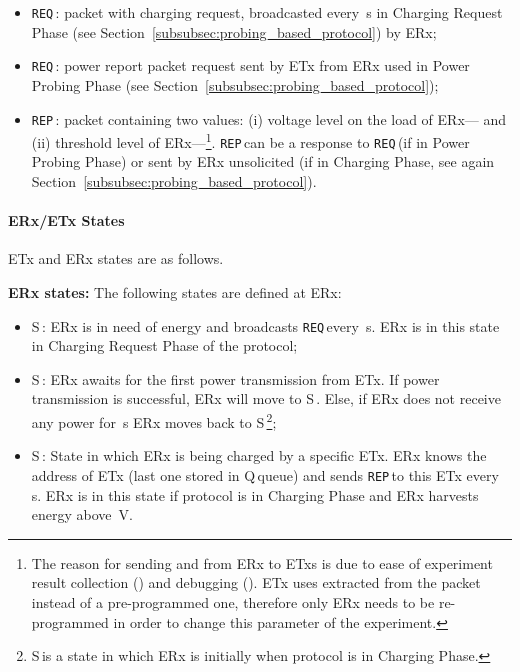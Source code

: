 \documentclass[11pt,draftclsnofoot,journal,onecolumn]{IEEEtran}
\newcommand{\textsubscript}[1]{}
\newcommand{\rxStateIdle}{\textsf{S\textsubscript{IDLE}}\,}
\newcommand{\rxStateWaiting}{\textsf{S\textsubscript{WAIT}}\,}
\newcommand{\rxStateCharged}{\textsf{S\textsubscript{CHARGED}}\,}
\newcommand{\rxDelayPing}{}
\newcommand{\rxDelayWaitingForPower}{}
\newcommand{\rxDelayPowerProbing}{}
\newcommand{\rxVoltageThreshold}{}
\newcommand{\chargingRequest}{\texttt{REQ\textsubscript{CRG}}\,}
\newcommand{\powerProbeReport}{\texttt{REP\textsubscript{PWR}}\,}
\newcommand{\powerProbeRequest}{\texttt{REQ\textsubscript{PWR}}\,}
\newcommand{\txAddressQueue}{Q\textsubscript{TX}\,}
\newcommand{\subparagraph}{}
\begin{document}
\begin{itemize}

\item \chargingRequest: packet with charging request, broadcasted every \rxDelayPing\,s in Charging Request Phase (see Section~\ref{subsubsec:probing_based_protocol}) by ERx;

\item \powerProbeRequest: power report packet request sent by ETx from ERx used in Power Probing Phase (see Section~\ref{subsubsec:probing_based_protocol});

\item \powerProbeReport: packet containing two values: (i) voltage level on the load of ERx--- and (ii) threshold level of ERx---\rxVoltageThreshold\footnote{The reason for sending  and \rxVoltageThreshold from ERx to ETxs is due to ease of experiment result collection () and debugging (\rxVoltageThreshold). ETx uses \rxVoltageThreshold extracted from the packet instead of a pre-programmed one, therefore only ERx needs to be re-programmed in order to change this parameter of the experiment.}. \powerProbeReport can be a response to \powerProbeRequest (if in Power Probing Phase) or sent by ERx unsolicited (if in Charging Phase, see again Section~\ref{subsubsec:probing_based_protocol}).

\end{itemize}

\paragraph{ERx/ETx States}
\label{sec:messages}

ETx and ERx states are as follows.

\subparagraph{\textbf{ERx states:}}\label{sec:p1_erx_states} The following states are defined at ERx:

\begin{itemize}
\item \rxStateIdle: ERx is in need of energy and broadcasts \chargingRequest every \rxDelayPing\,s. ERx is in this state in Charging Request Phase of the protocol;

\item \rxStateWaiting: ERx awaits for the first power transmission from ETx. If power transmission is successful, ERx will move to \rxStateCharged. Else, if ERx does not receive any power for \rxDelayWaitingForPower\,s ERx moves back to \rxStateIdle\footnote{\rxStateIdle is a state in which ERx is initially when protocol is in Charging Phase.};

\item \rxStateCharged: State in which ERx is being charged by a specific ETx. ERx knows the address of ETx (last one stored in \txAddressQueue queue) and sends \powerProbeReport to this ETx every \rxDelayPowerProbing\,s. ERx is in this state if protocol is in Charging Phase and ERx harvests energy above \rxVoltageThreshold\,V.
\end{itemize}
\end{document}
